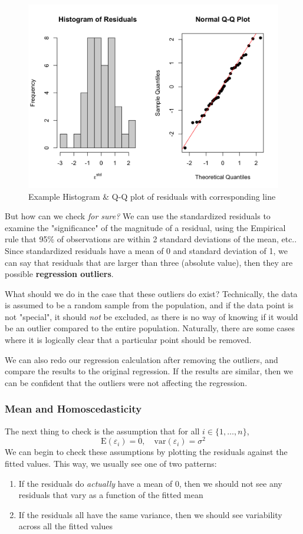 \documentclass[12pt]{article}
\begin{document}
\begin{figure}[!ht]
    \centering
    \includegraphics*[width=12cm]{img/qqplot.png}
    \caption{Example Histogram \& Q-Q plot of residuals with corresponding line}
\end{figure}
But how can we check \textit{for sure?} We can use the standardized residuals to examine the "significance" of the magnitude of a residual, using the Empirical rule that 95\% of observations are within 2 standard deviations of the mean, etc.. Since standardized residuals have a mean of 0 and standard deviation of 1, we can say that residuals that are larger than three (absolute value), then they are possible \textbf{regression outliers}.

What should we do in the case that these outliers do exist? Technically, the data is assumed to be a random sample from the population, and if the data point is not "special", it should \textit{not} be excluded, as there is no way of knowing if it would be an outlier compared to the entire population. Naturally, there are some cases where it is logically clear that a particular point should be removed.

We can also redo our regression calculation after removing the outliers, and compare the results to the original regression. If the results are similar, then we can be confident that the outliers were not affecting the regression.

\subsubsection{Mean and Homoscedasticity}

The next thing to check is the assumption that for all $i \in \{1,\dots,n\}$, \[\text{E}(\varepsilon_i) = 0, \quad \text{var}(\varepsilon_i) = \sigma^2\] We can begin to check these assumptions by plotting the residuals against the fitted values. This way, we usually see one of two patterns:\begin{enumerate}
    \item If the residuals do \textit{actually} have a mean of 0, then we should not see any residuals that vary as a function of the fitted mean
    \item If the residuals all have the same variance, then we should see variability across all the fitted values
\end{enumerate} 
\end{document}
